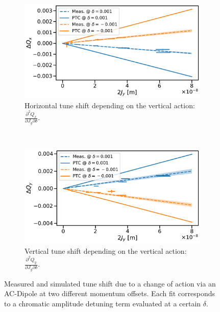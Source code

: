 \begin{figure}[H]
  \centering
  \begin{subfigure}{0.7\textwidth}
      \centering
      \includegraphics[width=\textwidth]{images/chromatic_amplitude_detuning/B2_Qxy.pdf}
      \caption{Horizontal tune shift depending on the vertical action: 
      $\frac{\partial^2 Q_x}{\partial J_y \partial \delta}$.}
      \label{figure:decapoles:chromatic_amplitude_detuning:b2qxy}
  \end{subfigure}
  \\[1em]
  \begin{subfigure}{0.7\textwidth}
      \centering
      \includegraphics[width=\textwidth]{images/chromatic_amplitude_detuning/B2_Qyy.pdf}
      \caption{Vertical tune shift depending on the vertical action: 
      $\frac{\partial^2 Q_y}{\partial J_y \partial \delta}$.}
      \label{figure:decapoles:chromatic_amplitude_detuning:b2qyy}
  \end{subfigure}
  \caption{Measured and simulated tune shift due to a change of action via an AC-Dipole at two
  different momentum offsets. Each fit corresponds to a chromatic amplitude detuning term evaluated
  at a certain $\delta$.}
  \label{figure:decapoles:chromatic_amplitude_detuning:two_terms}
\end{figure}



